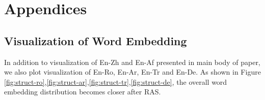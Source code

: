 \documentclass[11pt,a4paper]{article}
\newcommand{\method}{mRASP\xspace}
\begin{document}



\newpage

\appendix
\section{Appendices}
\label{sec:appendix}














\subsection{Visualization of Word Embedding}

In addition to visualization of En-Zh and En-Af presented in main body of paper, we also plot visualization of En-Ro, En-Ar, En-Tr and En-De. As shown in Figure \ref{fig:struct-ro},\ref{fig:struct-ar},\ref{fig:struct-tr},\ref{fig:struct-de}, the overall word embedding distribution becomes closer after RAS.




\begin{figure*}[!h]
\caption{Visualization of Word Embedding from \method w/o RAS vs \method w/ RAS for English-Romanian}
\label{fig:struct-ro}
\end{figure*}


\begin{figure*}[!h]
\caption{Visualization of Word Embedding from \method w/o RAS vs \method w/ RAS for English-Arabic}
\label{fig:struct-ar}
\end{figure*}



\begin{figure*}[!h]
\caption{Visualization of Word Embedding from \method w/o RAS vs \method w/ RAS for English-Turkish}
\label{fig:struct-tr}
\end{figure*}
\end{document}
